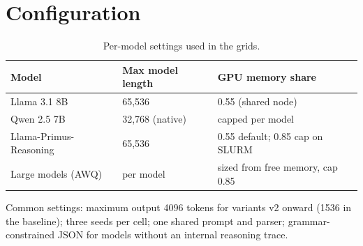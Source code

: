 \chapter{Configuration}
\label{app:config}
\begin{table}[H]
\centering
\caption{Per-model settings used in the grids.}
\small
\begin{tabular}{@{}lll@{}}
\toprule
\textbf{Model} & \textbf{Max model length} & \textbf{GPU memory share} \\
\midrule
Llama 3.1 8B & 65{,}536 & 0.55 (shared node) \\
Qwen 2.5 7B & 32{,}768 (native) & capped per model \\
Llama-Primus-Reasoning & 65{,}536 & 0.55 default; 0.85 cap on SLURM \\
Large models (AWQ) & per model & sized from free memory, cap 0.85 \\
\bottomrule
\end{tabular}
\end{table}
Common settings: maximum output 4096 tokens for variants v2 onward (1536 in the baseline); three seeds per cell; one shared prompt and parser; grammar-constrained JSON for models without an internal reasoning trace.
